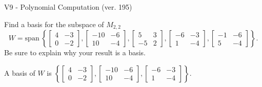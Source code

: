 \begin{exercise}
  \begin{exerciseTitle}V9 - Polynomial Computation (ver. 195)\end{exerciseTitle}
  \begin{exerciseStatement}
    Find a basis for the subspace of \(M_{2,2}\) 
\[W=\mathrm{span}\ \left\{\left[\begin{array}{cc}
4 & -3 \\
0 & -2
\end{array}\right] , \left[\begin{array}{cc}
-10 & -6 \\
10 & -4
\end{array}\right] , \left[\begin{array}{cc}
5 & 3 \\
-5 & 2
\end{array}\right] , \left[\begin{array}{cc}
-6 & -3 \\
1 & -4
\end{array}\right] , \left[\begin{array}{cc}
-1 & -6 \\
5 & -4
\end{array}\right]\right\}.\]
 Be sure to explain why your result is a basis.


  \end{exerciseStatement}
  \begin{exerciseAnswer}
   A basis of \(W\) is  \(\left\{\left[\begin{array}{cc}
4 & -3 \\
0 & -2
\end{array}\right] , \left[\begin{array}{cc}
-10 & -6 \\
10 & -4
\end{array}\right] , \left[\begin{array}{cc}
-6 & -3 \\
1 & -4
\end{array}\right]\right\}\).
  


  \end{exerciseAnswer}
\end{exercise}